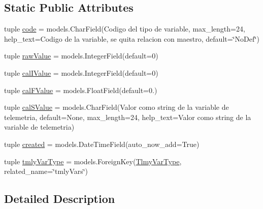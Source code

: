 \subsection*{Static Public Attributes}
\begin{DoxyCompactItemize}
\item 
tuple \hyperlink{class_ground_segment_1_1models_1_1_tmly_var_1_1_tmly_var_a25d017347ade2540b37c09596f233f0f}{code} = models.\+Char\+Field(\textquotesingle{}Codigo del tipo de variable\textquotesingle{}, max\+\_\+length=24, help\+\_\+text=\textquotesingle{}Codigo de la variable, se quita relacion con maestro\textquotesingle{}, default=\char`\"{}No\+Def\char`\"{})
\item 
tuple \hyperlink{class_ground_segment_1_1models_1_1_tmly_var_1_1_tmly_var_a1977b5e57c94d403dc4d6c624068ef59}{raw\+Value} = models.\+Integer\+Field(default=0)
\item 
tuple \hyperlink{class_ground_segment_1_1models_1_1_tmly_var_1_1_tmly_var_aee293dd968b0fa7700f66475eea0e32e}{cal\+I\+Value} = models.\+Integer\+Field(default=0)
\item 
tuple \hyperlink{class_ground_segment_1_1models_1_1_tmly_var_1_1_tmly_var_a1d579b5da80d996dad47a99a4ae4cea1}{cal\+F\+Value} = models.\+Float\+Field(default=0.)
\item 
tuple \hyperlink{class_ground_segment_1_1models_1_1_tmly_var_1_1_tmly_var_a49dc6e8d2412bdc61c595b4bdc3c2cbc}{cal\+S\+Value} = models.\+Char\+Field(\textquotesingle{}Valor como string de la variable de telemetria\textquotesingle{}, default=None, max\+\_\+length=24, help\+\_\+text=\textquotesingle{}Valor como string de la variable de telemetria\textquotesingle{})
\item 
tuple \hyperlink{class_ground_segment_1_1models_1_1_tmly_var_1_1_tmly_var_acc0d1d6a558e6194dfd4fbd375df6f67}{created} = models.\+Date\+Time\+Field(auto\+\_\+now\+\_\+add=True)
\item 
tuple \hyperlink{class_ground_segment_1_1models_1_1_tmly_var_1_1_tmly_var_afeaa04d580bfeb6ff0344998329d8d23}{tmly\+Var\+Type} = models.\+Foreign\+Key(\hyperlink{class_ground_segment_1_1models_1_1_tlmy_var_type_1_1_tlmy_var_type}{Tlmy\+Var\+Type}, related\+\_\+name=\char`\"{}tmly\+Vars\char`\"{})
\end{DoxyCompactItemize}


\subsection{Detailed Description}


